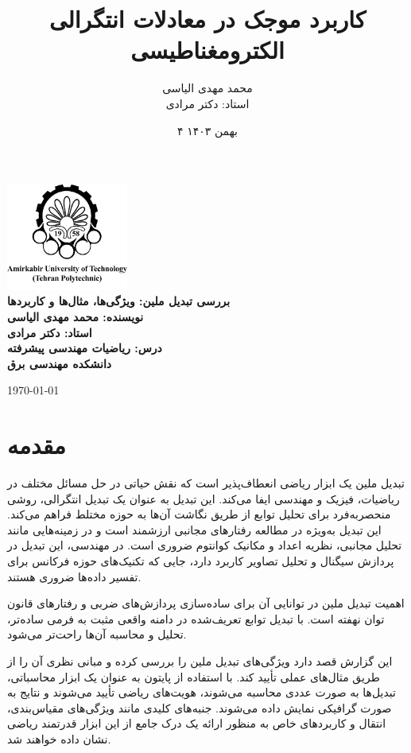 \documentclass[12pt,a4paper]{article}
\title{کاربرد موجک در معادلات انتگرالی الکترومغناطیسی}
\author{محمد مهدی الیاسی \\ استاد: دکتر مرادی}
\date{۴ بهمن ۱۴۰۳}
\begin{document}
\begin{center}
    \includegraphics[width=0.3\textwidth]{amirkabir.png} \\[2em]
    
    \LARGE \textbf{بررسی تبدیل ملین: ویژگی‌ها، مثال‌ها و کاربردها} \\[1em]
    \large \textbf{نویسنده: محمد مهدی الیاسی} \\[1em]
    \large \textbf{استاد: دکتر مرادی}\\[1em]
    \large \textbf{درس: ریاضیات مهندسی پیشرفته} \\[4em]
    \large \textbf{دانشکده مهندسی برق} \\[4em]
\end{center}

\vfill
\begin{center}
    \large \today
\end{center}

\newpage

\tableofcontents
\newpage

\section{مقدمه}
تبدیل ملین یک ابزار ریاضی انعطاف‌پذیر است که نقش حیاتی در حل مسائل مختلف در ریاضیات، فیزیک و مهندسی ایفا می‌کند\cite{Mellin}. این تبدیل به عنوان یک تبدیل انتگرالی، روشی منحصربه‌فرد برای تحلیل توابع از طریق نگاشت آن‌ها به حوزه مختلط فراهم می‌کند. این تبدیل به‌ویژه در مطالعه رفتارهای مجانبی ارزشمند است و در زمینه‌هایی مانند تحلیل مجانبی، نظریه اعداد و مکانیک کوانتوم ضروری است. در مهندسی، این تبدیل در پردازش سیگنال و تحلیل تصاویر کاربرد دارد، جایی که تکنیک‌های حوزه فرکانس برای تفسیر داده‌ها ضروری هستند.

اهمیت تبدیل ملین در توانایی آن برای ساده‌سازی پردازش‌های ضربی و رفتارهای قانون توان نهفته است. با تبدیل توابع تعریف‌شده در دامنه واقعی مثبت به فرمی ساده‌تر، تحلیل و محاسبه آن‌ها راحت‌تر می‌شود.

این گزارش قصد دارد ویژگی‌های تبدیل ملین را بررسی کرده و مبانی نظری آن را از طریق مثال‌های عملی تأیید کند. با استفاده از پایتون به عنوان یک ابزار محاسباتی، تبدیل‌ها به صورت عددی محاسبه می‌شوند، هویت‌های ریاضی تأیید می‌شوند و نتایج به صورت گرافیکی نمایش داده می‌شوند. جنبه‌های کلیدی مانند ویژگی‌های مقیاس‌بندی، انتقال و کاربردهای خاص به منظور ارائه یک درک جامع از این ابزار قدرتمند ریاضی نشان داده خواهند شد.
\end{document}
